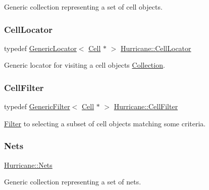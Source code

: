 Generic collection representing a set of cell objects. \mbox{\label{namespaceHurricane_abd99adab3b5944a4d1ace3d0b0b34f57}} 
\subsubsection{\texorpdfstring{Cell\+Locator}{CellLocator}}
{\footnotesize\ttfamily typedef \mbox{\hyperlink{classHurricane_1_1GenericLocator}{Generic\+Locator}}$<$ \mbox{\hyperlink{classHurricane_1_1Cell}{Cell}} $\ast$ $>$ \mbox{\hyperlink{namespaceHurricane_abd99adab3b5944a4d1ace3d0b0b34f57}{Hurricane\+::\+Cell\+Locator}}}

Generic locator for visiting a cell objects \mbox{\hyperlink{classHurricane_1_1Collection}{Collection}}. \mbox{\label{namespaceHurricane_addb0e9cd376680ecea4966516694b799}} 
\subsubsection{\texorpdfstring{Cell\+Filter}{CellFilter}}
{\footnotesize\ttfamily typedef \mbox{\hyperlink{classHurricane_1_1GenericFilter}{Generic\+Filter}}$<$ \mbox{\hyperlink{classHurricane_1_1Cell}{Cell}} $\ast$ $>$ \mbox{\hyperlink{namespaceHurricane_addb0e9cd376680ecea4966516694b799}{Hurricane\+::\+Cell\+Filter}}}

\mbox{\hyperlink{classHurricane_1_1Filter}{Filter}} to selecting a subset of cell objects matching some criteria. \mbox{\label{namespaceHurricane_a3404a8b17130a1824f4a281704b04df7}} 
\subsubsection{\texorpdfstring{Nets}{Nets}}
{\footnotesize\ttfamily \mbox{\hyperlink{namespaceHurricane_a3404a8b17130a1824f4a281704b04df7}{Hurricane\+::\+Nets}}}

Generic collection representing a set of nets. \mbox{\label{namespaceHurricane_a2911512d442f8332c3cd3a135332cc02}} 
